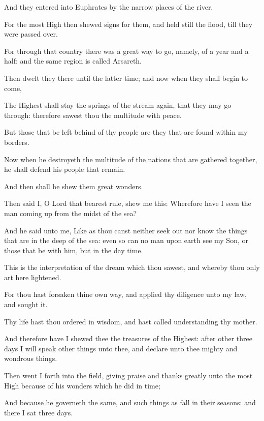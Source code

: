 {\par }{\PP {}And they entered into Euphrates by the narrow places of the river.
\par }{\PP {}For the most High then shewed signs for them, and held still the flood, till they were passed over.
\par }{\PP {}For through that country there was a great way to go, namely, of a year and a half: and the same region is called Arsareth.
\par }{\PP {}Then dwelt they there until the latter time; and now when they shall begin to come,
\par }{\PP {}The Highest shall stay the springs of the stream again, that they may go through: therefore sawest thou the multitude with peace.
\par }{\PP {}But those that be left behind of thy people are they that are found within my borders.
\par }{\PP {}Now when he destroyeth the multitude of the nations that are gathered together, he shall defend his people that remain.
\par }{\PP {}And then shall he shew them great wonders.
\par }{\PP {}Then said I, O Lord that bearest rule, shew me this: Wherefore have I seen the man coming up from the midst of the sea?
\par }{\PP {}And he said unto me, Like as thou canst neither seek out nor know the things that are in the deep of the sea: even so can no man upon earth see my Son, or those that be with him, but in the day time.
\par }{\PP {}This is the interpretation of the dream which thou sawest, and whereby thou only art here lightened.
\par }{\PP {}For thou hast forsaken thine own way, and applied thy diligence unto my law, and sought it.
\par }{\PP {}Thy life hast thou ordered in wisdom, and hast called understanding thy mother.
\par }{\PP {}And therefore have I shewed thee the treasures of the Highest: after other three days I will speak other things unto thee, and declare unto thee mighty and wondrous things.
\par }{\PP {}Then went I forth into the field, giving praise and thanks greatly unto the most High because of his wonders which he did in time;
\par }{\PP {}And because he governeth the same, and such things as fall in their seasons: and there I sat three days.

}
